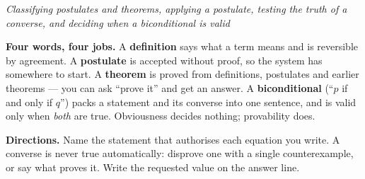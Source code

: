 \documentclass[12pt]{article}
\begin{document}

\begin{center}
\textit{Classifying postulates and theorems, applying a postulate, testing the
truth of a converse, and deciding when a biconditional is valid}
\end{center}

\noindent\small\textbf{Four words, four jobs.} A \textbf{definition} says what a
term means and is reversible by agreement. A \textbf{postulate} is accepted
without proof, so the system has somewhere to start. A \textbf{theorem} is
proved from definitions, postulates and earlier theorems --- you can ask
``prove it'' and get an answer. A \textbf{biconditional} (``$p$ if and only if
$q$'') packs a statement and its converse into one sentence, and is valid only
when \emph{both} are true. Obviousness decides nothing; provability does.

\smallskip
\noindent\textbf{Directions.} Name the statement that authorises each equation
you write. A converse is never true automatically: disprove one with a single
counterexample, or say what proves it. Write the requested value on the answer
line.\normalsize


\end{document}
